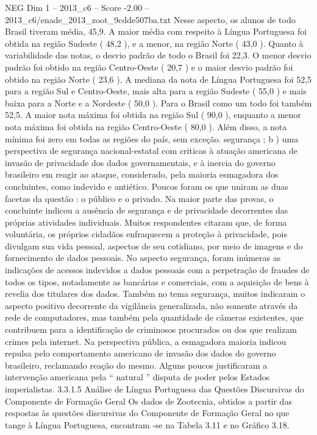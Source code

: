 \begin{textsample}{NEG Dim 1 – 2013\_c6 – Score -2.00 – 2013\_c6/enade\_2013\_zoot\_9cdde507ba.txt}
Nesse aspecto, os alunos de todo Brasil tiveram média, 45,9.
A maior média com respeito à Língua Portuguesa foi obtida na região Sudeste ( 48,2 ), e a menor, na região Norte ( 43,0 ).
Quanto à variabilidade das notas, o desvio padrão de todo o Brasil foi 22,3.
O menor desvio padrão foi obtido na região Centro-Oeste ( 20,7 ) e o maior desvio padrão foi obtido na região Norte ( 23,6 ).
A mediana da nota de Língua Portuguesa foi 52,5 para a região Sul e Centro-Oeste, mais alta para a região Sudeste ( 55,0 ) e mais baixa para a Norte e a Nordeste ( 50,0 ).
Para o Brasil como um todo foi também 52,5.
A maior nota máxima foi obtida na região Sul ( 90,0 ), enquanto a menor nota máxima foi obtida na região Centro-Oeste ( 80,0 ).
Além disso, a nota mínima foi zero em todas as regiões do país, sem exceção. segurança ; b ) uma perspectiva de segurança nacional-estatal com criticas à atuação americana de invasão de privacidade dos dados governamentais, e à inercia do governo brasileiro em reagir ao ataque, considerado, pela maioria esmagadora dos concluintes, como indevido e antiético.
Poucos foram os que uniram as duas facetas da questão : o público e o privado.
Na maior parte das provas, o concluinte indicou a ausência de segurança e de privacidade decorrentes das próprias atividades individuais.
Muitos respondentes citaram que, de forma voluntária, os próprios cidadãos enfraquecem a proteção à privacidade, pois divulgam sua vida pessoal, aspectos de seu cotidiano, por meio de imagens e do fornecimento de dados pessoais.
No aspecto segurança, foram inúmeras as indicações de acessos indevidos a dados pessoais com a perpetração de fraudes de todos os tipos, notadamente as bancárias e comerciais, com a aquisição de bens à revelia dos titulares dos dados.
Também no tema segurança, muitos indicaram o aspecto positivo decorrente da vigilância generalizada, não somente através da rede de computadores, mas também pela quantidade de câmeras existentes, que contribuem para a identificação de criminosos procurados ou dos que realizam crimes pela internet.
Na perspectiva pública, a esmagadora maioria indicou repulsa pelo comportamento americano de invasão dos dados do governo brasileiro, reclamando reação do mesmo.
Alguns poucos justificaram a intervenção americana pela “ natural ” disputa de poder pelos Estados imperialistas. 3.3.1.5 Análise de Língua Portuguesa das Questões Discursivas do Componente de Formação Geral Os dados de Zootecnia, obtidos a partir das respostas às questões discursivas do Componente de Formação Geral no que tange à Língua Portuguesa, encontram -se na Tabela 3.11 e no Gráfico 3.18.

\end{textsample}
